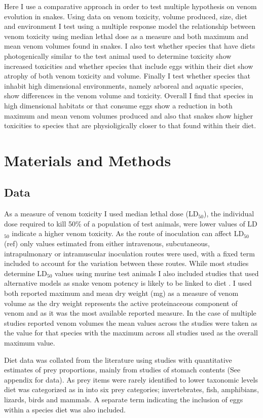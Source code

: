Here I use a comparative approach in order to test multiple hypothesis on venom evolution in snakes. Using data on venom toxicity, volume produced, size, diet and environment I test using a multiple response model the relationship between venom toxicity using median lethal dose as a measure and both maximum and mean venom volumes found in snakes. I also test whether species that have diets photogenically similar to the test animal used to determine toxicity show increased toxicities and whether species that include eggs within their diet show atrophy of both venom toxicity and volume. Finally I test whether species that inhabit high dimensional environments, namely arboreal and aquatic species, show differences in the venom volume and toxicity. Overall I find that species in high dimensional habitats or that consume eggs show a reduction in both maximum and mean venom volumes produced and also that snakes show higher toxicities to species that are physioligically closer to that found within their diet.

\section{Materials and Methods}
\subsection{Data}

As a measure of venom toxicity I used median lethal dose (LD$_{50}$), the individual dose required to kill 50\% of a population of test animals, were lower values of LD$_{50}$ indicate a higher venom toxicity. As the route of inoculation can affect LD$_{50}$ (ref) only values estimated from either intravenous, subcutaneous, intrapulmonary or intramuscular inoculation routes were used, with a fixed term included to account for the variation between these routes. While most studies determine LD$_{50}$ values using murine test animals I also included studies that used alternative models as snake venom potency is likely to be linked to diet \citep{barlow2009coevolution}. I used both reported maximum and mean dry weight (mg) as a measure of venom volume as the dry weight represents the active proteinaceous component of venom and as it was the most available reported measure. In the case of multiple studies reported venom volumes the mean values across the studies were taken as the value for that species with the maximum across all studies used as the overall maximum value.


Diet data was collated from the literature using studies with quantitative estimates of prey proportions, mainly from studies of stomach contents (See appendix for data). As prey items were rarely identified to lower taxonomic levels diet was categorized as in \citep{allen2013evolution} into six prey categories; invertebrates, fish, amphibians, lizards, birds and mammals. A separate term indicating the inclusion of eggs within a species diet was also included.


